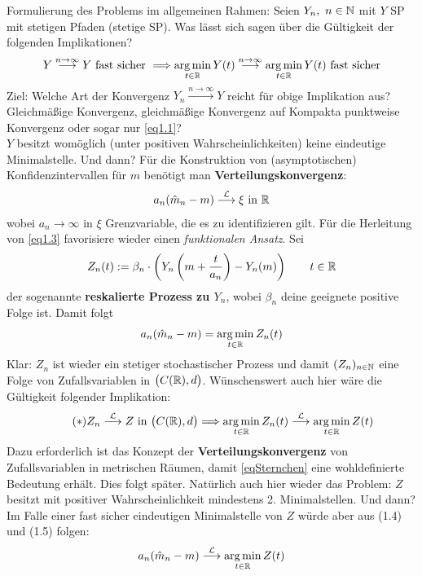Formulierung des Problems im allgemeinen Rahmen:
Seien $Y_n,~n\in\mathbb{N}$ mit $Y$ SP mit stetigen Pfaden (stetige SP).
Was lässt sich sagen über die Gültigkeit der folgenden Implikationen?
\begin{align}
	Y
	\stackrel{n\to\infty}{\longrightarrow}
	Y\text{ fast sicher }
	\Longrightarrow
	\operatorname*{arg\,min}\limits_{t\in\mathbb{R}} Y(t)
	\stackrel{n\to\infty}{\longrightarrow}
	\operatorname*{arg\,min}\limits_{t\in\mathbb{R}} Y(t)\text{ fast sicher}
\end{align}
Ziel: Welche Art der Konvergenz $Y_n\stackrel{n\to\infty}{\longrightarrow} Y$ reicht für obige Implikation aus? Gleichmäßige Konvergenz, gleichmäßige Konvergenz auf Kompakta punktweise Konvergenz oder sogar nur \eqref{eq1.1}?\\
$Y$ besitzt womöglich (unter positiven Wahrscheinlichkeiten) keine eindeutige Minimalstelle. Und dann?\nl
Für die Konstruktion von (asymptotischen) Konfidenzintervallen für $m$ benötigt man \textbf{Verteilungskonvergenz}:
\begin{align}\label{eq1.3}
	a_n(\hat{m}_n-m)
	\stackrel{\mathcal{L}}{\longrightarrow}\xi\text{ in }\mathbb{R}
\end{align}
wobei $a_n\to\infty$ in $\xi$ Grenzvariable, die es zu identifizieren gilt. Für die Herleitung von \eqref{eq1.3} favorisiere wieder einen \textit{funktionalen Ansatz}. Sei
\begin{align*}
	Z_n(t):=\beta_n\cdot\left( Y_n\left(m+\frac{t}{a_n}\right)-Y_n(m)\right)\qquad t\in\mathbb{R}
\end{align*}
der sogenannte \textbf{reskalierte Prozess zu $Y_n$}, wobei $\beta_n$ deine geeignete positive Folge ist. Damit folgt
\begin{align}\label{1.4}
	a_n(\hat{m}_n-m)=\operatorname*{arg\,min}\limits_{t\in\mathbb{R}} Z_n(t)
\end{align}
Klar: $Z_n$ ist wieder ein stetiger stochastischer Prozess und damit $(Z_n)_{n\in\mathbb{N}}$ eine Folge von Zufallsvariablen in $\big(C(\mathbb{R}),d\big)$.
Wünschenswert auch hier wäre die Gültigkeit folgender Implikation:
\begin{align}\label{eqSternchen}\tag{$\ast$}
	Z_n
	\stackrel{\mathcal{L}}{\longrightarrow}
	Z\text{ in } \big(C(\mathbb{R}),d\big)
	\Longrightarrow
	\operatorname*{arg\,min}\limits_{t\in\mathbb{R}} Z_n(t)
	\stackrel{\mathcal{L}}{\longrightarrow}
	\operatorname*{arg\,min}\limits_{t\in\mathbb{R}} Z(t)
\end{align}
Dazu erforderlich ist das Konzept der \textbf{Verteilungskonvergenz} von Zufallsvariablen in metrischen Räumen, damit \eqref{eqSternchen} eine wohldefinierte Bedeutung erhält.
Dies folgt später.
Natürlich auch hier wieder das Problem: $Z$ besitzt mit positiver Wahrscheinlichkeit mindestens 2. Minimalstellen. 
Und dann?\nl
Im Falle einer fast sicher eindeutigen Minimalstelle von $Z$ würde aber aus (1.4) und (1.5) folgen:
\begin{align*}
	a_n(\hat{m}_n-m)
	\stackrel{\mathcal{L}}{\longrightarrow}
	\operatorname*{arg\,min}\limits_{t\in\mathbb{R}} Z(t)
\end{align*}